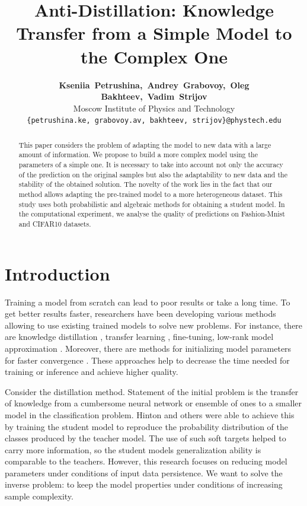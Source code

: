 \documentclass[80pt]{article}
\title{Anti-Distillation: Knowledge Transfer from a Simple Model to the Complex One}
\author{\textbf{Kseniia~Petrushina,~Andrey~Grabovoy,~Oleg Bakhteev,~Vadim~Strijov} \\
	Moscow Institute of Physics and Technology \\
	\texttt{\{petrushina.ke,~grabovoy.av,~bakhteev,~strijov\}@phystech.edu}
}
\date{}
\begin{document}
\maketitle

\begin{abstract}
	This paper considers the problem of adapting the model to new data with a large amount of information. We propose to build a more complex model using the parameters of a simple one. It is necessary to take into account not only the accuracy of the prediction on the original samples but also the adaptability to new data and the stability of the obtained solution. The novelty of the work lies in the fact that our method allows adapting the pre-trained model to a more heterogeneous dataset. This study uses both probabilistic and algebraic methods for obtaining a student model. In the computational experiment, we analyse the quality of predictions on Fashion-Mnist and CIFAR10 datasets.
\end{abstract}


\section{Introduction}
Training a model from scratch can lead to poor results or take a long time. To get better results faster, researchers have been developing various methods allowing to use existing trained models to solve new problems. For instance, there are knowledge distillation \citep{hinton2015distilling, lopezpaz2016unifying}, transfer learning \citep{zhuang2019acomprehensive}, fine-tuning, low-rank model approximation \citep{yu2017oncompressing}. Moreover, there are methods for initializing model parameters for faster convergence \citep{glorot2010understanding}. These approaches help to decrease the time needed for training or inference and achieve higher quality.

Consider the distillation method. Statement of the initial problem is the transfer of knowledge from a cumbersome neural network or ensemble of ones to a smaller model in the classification problem. Hinton and others \citep{hinton2015distilling} were able to achieve this by training the student model to reproduce the probability distribution of the classes produced by the teacher model. The use of such soft targets helped to carry more information, so the student models generalization ability is comparable to the teachers. However, this research focuses on reducing model parameters under conditions of input data persistence. We want to solve the inverse problem: to keep the model properties under conditions of increasing sample complexity.
\end{document}
